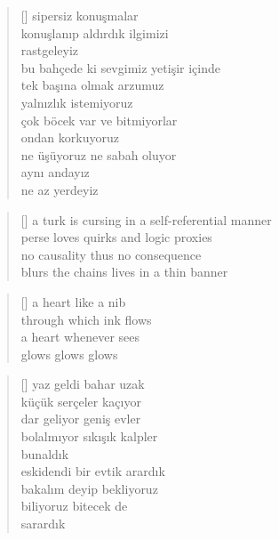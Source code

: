 \documentclass[10pt, openright, twoside]{memoir}
\theoremstyle{definition}
\begin{document}
\settowidth{\versewidth}{bu bahçede ki sevgimiz yetişir içinde}
\begin{verse}[\versewidth]
  sipersiz konuşmalar \\
  konuşlanıp aldırdık ilgimizi \\
  rastgeleyiz \\
  bu bahçede ki sevgimiz yetişir içinde \\
  tek başına olmak arzumuz \\
  yalnızlık istemiyoruz \\
  çok böcek var ve bitmiyorlar \\
  ondan korkuyoruz \\
  ne üşüyoruz ne sabah oluyor \\
  aynı andayız \\
  ne az yerdeyiz \\
\end{verse}
\vspace*{\fill}
%
\newpage
{}
\vspace*{\fill}
\settowidth{\versewidth}{a turk is cursing in a self-referential manner}
\begin{verse}[\versewidth]
  a turk is cursing in a self-referential manner \\
  perse loves quirks and logic proxies \\
  no causality thus no consequence \\
  blurs the chains lives in a thin banner \\
\end{verse}
\vspace*{\fill}
%
\newpage
{}
\vspace*{\fill}
\settowidth{\versewidth}{through which ink flows}
\begin{verse}[\versewidth]
  a heart like a nib \\
  through which ink flows \\
  a heart whenever sees \\
  glows glows glows \\
\end{verse}
\vspace*{\fill}
%
\newpage
{}
\vspace*{\fill}
\settowidth{\versewidth}{eskidendi bir evtik arardık}
\begin{verse}[\versewidth]
  yaz geldi bahar uzak \\
  küçük serçeler kaçıyor \\
  dar geliyor geniş evler \\
  bolalmıyor sıkışık kalpler \\
  bunaldık \\
  eskidendi bir evtik arardık \\
  bakalım deyip bekliyoruz \\
  biliyoruz bitecek de \\
  sarardık \\
\end{verse}
\end{document}
